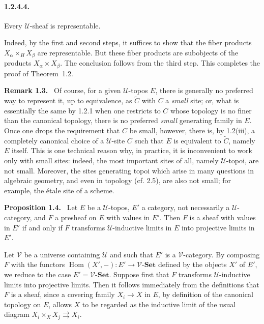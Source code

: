 \documentclass[11pt]{article}
\newcommand{\U}{\mathcal{U}}
\newcommand{\V}{\mathcal{V}}
\newcommand{\Set}{\mathbf{Set}}
\newcommand{\Hom}{\operatorname{Hom}}
\newenvironment{statement}[1]{\par\medskip\noindent\textbf{#1.}\ }{\par\medskip}
\newenvironment{remarktext}[1]{\par\medskip\noindent\textbf{#1.}\ }{\par\medskip}
\begin{document}
\paragraph{1.2.4.4.} Every \(\U\)-sheaf is representable.

Indeed, by the first and second steps, it suffices to show that the fiber products \(X_\alpha\times_HX_\beta\) are representable. But these fiber products are subobjects of the products \(X_\alpha\times X_\beta\). The conclusion follows from the third step. This completes the proof of Theorem~1.2.

\begin{remarktext}{Remark 1.3}
Of course, for a given \(\U\)-topos \(E\), there is generally no preferred way to represent it, up to equivalence, as \(\widetilde C\) with \(C\) a \emph{small} site; or, what is essentially the same by 1.2.1 when one restricts to \(C\) whose topology is no finer than the canonical topology, there is no preferred \emph{small} generating family in \(E\). Once one drops the requirement that \(C\) be small, however, there is, by 1.2(iii), a completely canonical choice of a \(\U\)-site \(C\) such that \(E\) is equivalent to \(\widetilde C\), namely \(E\) itself. This is one technical reason why, in practice, it is inconvenient to work only with small sites: indeed, the most important sites of all, namely \(\U\)-topoi, are not small. Moreover, the sites generating topoi which arise in many questions in algebraic geometry, and even in topology (cf. 2.5), are also not small; for example, the \'etale site of a scheme.
\end{remarktext}

\begin{statement}{Proposition 1.4}
Let \(E\) be a \(\U\)-topos, \(E'\) a category, not necessarily a \(\U\)-category, and \(F\) a presheaf on \(E\) with values in \(E'\). Then \(F\) is a sheaf with values in \(E'\) if and only if \(F\) transforms \(\U\)-inductive limits in \(E\) into projective limits in \(E'\).
\end{statement}

Let \(\V\) be a universe containing \(\U\) and such that \(E'\) is a \(\V\)-category. By composing \(F\) with the functors \(\Hom(X',-):E'\to\V\text{-}\Set\) defined by the objects \(X'\) of \(E'\), we reduce to the case \(E'=\V\text{-}\Set\). Suppose first that \(F\) transforms \(\U\)-inductive limits into projective limits. Then it follows immediately from the definitions that \(F\) is a sheaf, since a covering family \(X_i\to X\) in \(E\), by definition of the canonical topology on \(E\), allows \(X\) to be regarded as the inductive limit of the usual diagram \(X_i\times_XX_j\rightrightarrows X_i\).
\end{document}
